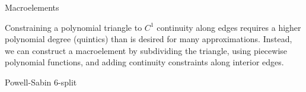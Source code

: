 \begin{foil}{Macroelements}

Constraining a polynomial triangle to $C^1$ continuity along edges
requires a higher polynomial degree (quintics) than is desired for
many approximations.  Instead, we can construct a macroelement by
subdividing the triangle, using piecewise polynomial functions, and
adding continuity constraints along interior edges.

\begin{center}
\end{center}



\end{foil}



\begin{foil}{Powell-Sabin 6-split}
\begin{center}
\end{center}
\end{foil}

